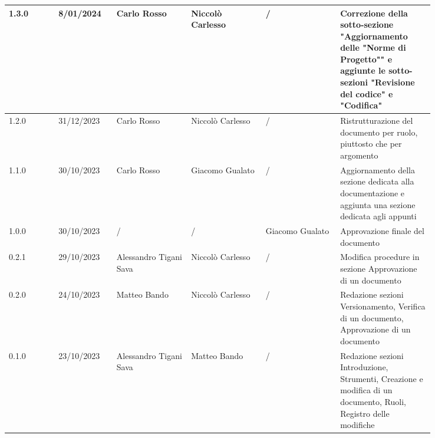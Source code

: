 {\begin{longtable}{p{0.10\linewidth}p{0.10\linewidth}p{0.15\linewidth}p{0.15\linewidth}p{0.15\linewidth}p{0.19\linewidth}}
	  \hline
	  1.3.0	& 8/01/2024     & Carlo Rosso            & Niccolò Carlesso	& /					& Correzione della sotto-sezione "Aggiornamento delle "Norme di Progetto"" e aggiunte le sotto-sezioni "Revisione del codice" e "Codifica" \\
	  \hline
	  1.2.0	& 31/12/2023    & Carlo Rosso            & Niccolò Carlesso	& /					& Ristrutturazione del documento per ruolo, piuttosto che per argomento	\\
	  \hline
	  1.1.0	& 30/10/2023    & Carlo Rosso            & Giacomo Gualato	& /					& Aggiornamento della sezione dedicata alla documentazione e aggiunta una sezione dedicata agli appunti	\\
	  \hline
	  1.0.0	& 30/10/2023    & /                      & /				& Giacomo Gualato	& Approvazione finale del documento \\
	  \hline
	  0.2.1	& 29/10/2023    & Alessandro Tigani Sava & Niccolò Carlesso	& /					& Modifica procedure in sezione Approvazione di un documento	\\
	  \hline
	  0.2.0	& 24/10/2023    & Matteo Bando           & Niccolò Carlesso	& /					& Redazione sezioni Versionamento, Verifica di un documento, Approvazione di un documento	\\
	  \hline
	  0.1.0	& 23/10/2023    & Alessandro Tigani Sava & Matteo Bando		& /					& Redazione sezioni Introduzione, Strumenti, Creazione e modifica di un documento, Ruoli, Registro delle modifiche	\\
	  \hline
  \end{longtable}
 }
